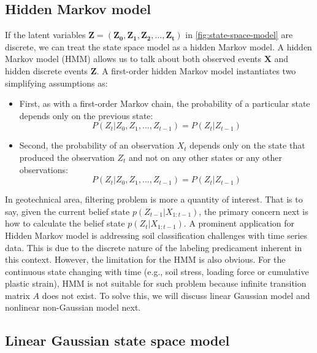 \subsection{Hidden Markov model}

        
If the latent variables $\boldsymbol{Z} = (\boldsymbol{Z_0},\boldsymbol{Z_1},\boldsymbol{Z_2},...,\boldsymbol{Z_t})$ in \cref{fig:state-space-model} are discrete, we can treat the state space model as a hidden Markov model.  A hidden Markov model (HMM) allows us to talk about both observed events  $\boldsymbol{X}$ and hidden discrete events  $\boldsymbol{Z}$. A first-order hidden Markov model instantiates two simplifying assumptions as:

\begin{itemize}
      \item  First, as with a first-order Markov chain, the probability of a particular state depends
 only on the previous state:
         \begin{equation}
         P(Z_t|Z_0,Z_1,...,Z_{t-1})= P(Z_t|Z_{t-1})             
         \end{equation}      
      \item Second, the probability of an  observation $X_t$ depends only on the state that
 produced the observation $Z_t$ and not on any other states or any other observations:
          \begin{equation}
         P(Z_t|Z_0,Z_1,...,Z_{t-1})= P(Z_t|Z_{t-1})             
         \end{equation} 
\end{itemize}
In geotechnical area, filtering problem is more a quantity of interest. That is to say, given the current belief state $p(Z_{t-1}|X_{1:t-1})$, the primary concern next is how to calculate the belief state $p(Z_t|X_{1:t-1})$.
A prominent application for Hidden Markov model is addressing soil classification challenges with time series data. This is due to the discrete nature of the labeling predicament inherent in this context. However, the limitation for the HMM is also obvious. For the continuous state changing with time (e.g., soil stress, loading force or cumulative plastic strain), HMM is not suitable for such problem because infinite transition matrix $A$ does not exist. To solve this, we will discuss linear Gaussian model and nonlinear non-Gaussian model next. 







\subsection{Linear Gaussian state space model}

